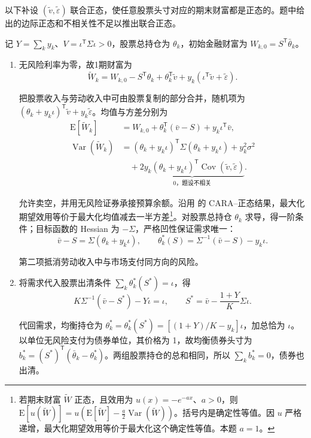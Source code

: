 \begin{solution}[blank-type=manual,blank-vsep=9\baselineskip]
以下补设 $(\widetilde v,\widetilde\varepsilon)$ 联合正态，使任意股票头寸对应的期末财富都是正态的。题中给出的边际正态和不相关性不足以推出联合正态。

记 $Y=\sum_ky_k$、$V=\iota^{\mathsf T}\Sigma\iota>0$，股票总持仓为 $\theta_k$，初始金融财富为 $W_{k,0}=S^{\mathsf T}\bar\theta_k$。
\begin{enumerate}[label=(\alph*)]
\item 无风险利率为零，故1期财富为
\[
 \widetilde W_k=W_{k,0}-S^{\mathsf T}\theta_k
 +\theta_k^{\mathsf T}\widetilde v+y_k(\iota^{\mathsf T}\widetilde v+\widetilde\varepsilon).
\]

把股票收入与劳动收入中可由股票复制的部分合并，随机项为 $(\theta_k+y_k\iota)^{\mathsf T}\widetilde v+y_k\widetilde\varepsilon$。均值与方差分别为
\[
 \begin{aligned}
 \mathrm E[\widetilde W_k]&=W_{k,0}+\theta_k^{\mathsf T}(\bar v-S)+y_k\iota^{\mathsf T}\bar v,\\
 \operatorname{Var}(\widetilde W_k)
 &=(\theta_k+y_k\iota)^{\mathsf T}\Sigma(\theta_k+y_k\iota)+y_k^2\sigma^2\\
 &\quad+\underbrace{2y_k(\theta_k+y_k\iota)^{\mathsf T}
                 \operatorname{Cov}(\widetilde v,\widetilde\varepsilon)}_{0\text{，题设不相关}}.
 \end{aligned}
\]

允许卖空，并用无风险证券承接预算余额。沿用 的 CARA--正态结果，最大化期望效用等价于最大化均值减去一半方差\footnote{若期末财富 $\widetilde W$ 正态，且效用为 $u(x)=-e^{-ax}$、$a>0$，则 $\mathrm E[u(\widetilde W)]=u(\mathrm E[\widetilde W]-\tfrac a2\operatorname{Var}(\widetilde W))$。括号内是确定性等值。因 $u$ 严格递增，最大化期望效用等价于最大化这个确定性等值。本题 $a=1$。}。对股票总持仓 $\theta_k$ 求导，得一阶条件；目标函数的 Hessian 为 $-\Sigma$，严格凹性保证需求唯一：
\[
 \bar v-S=\Sigma(\theta_k+y_k\iota),\qquad
 \boxed{\theta_k^*(S)=\Sigma^{-1}(\bar v-S)-y_k\iota}.
\]

第二项抵消劳动收入中与市场支付同方向的风险。

\item 将需求代入股票出清条件 $\sum_k\theta_k^*(S^*)=\iota$，得
\[
 K\Sigma^{-1}(\bar v-S^*)-Y\iota=\iota,
 \qquad \boxed{S^*=\bar v-\frac{1+Y}{K}\Sigma\iota}.
\]

代回需求，均衡持仓为 $\theta_k^*=\theta_k^*(S^*)=[(1+Y)/K-y_k]\iota$，加总恰为 $\iota$。以单位无风险支付为债券单位，其价格为 1，故均衡债券头寸为 $b_k^*=(S^*)^{\mathsf T}(\bar\theta_k-\theta_k^*)$。两组股票持仓的总和相同，所以 $\sum_k b_k^*=0$，债券也出清。


\end{enumerate}
\end{solution}
